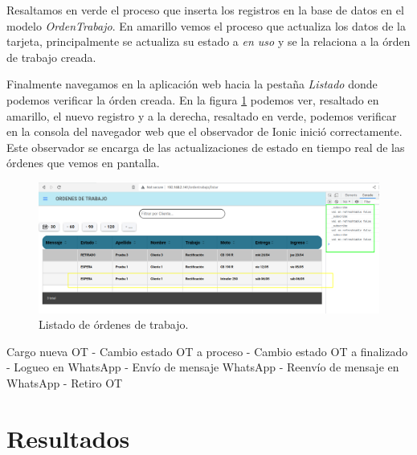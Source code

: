 Resaltamos en verde el proceso que inserta los registros en la base de datos en el modelo \textit{OrdenTrabajo}. En amarillo vemos el proceso que actualiza los datos de la tarjeta, principalmente se actualiza su estado a \textit{en uso} y se la relaciona a la órden de trabajo creada.

Finalmente navegamos en la aplicación web hacia la pestaña \textit{Listado} donde podemos verificar la órden creada. En la figura \ref{fig:ensayolistado} podemos ver, resaltado en amarillo, el nuevo registro y a la derecha, resaltado en verde, podemos verificar en la consola del navegador web que el observador de Ionic inició correctamente. Este observador se encarga de las actualizaciones de estado en tiempo real de las órdenes que vemos en pantalla.

\begin{figure}[H]
	\centering
	\includegraphics[width=\textwidth]{./Figures/ensayo-1/11.listado.png}
	\caption{Listado de órdenes de trabajo.}
	\label{fig:ensayolistado}
\end{figure}


Cargo nueva OT
- Cambio estado OT a proceso
- Cambio estado OT a finalizado
- Logueo en WhatsApp
- Envío de mensaje WhatsApp
- Reenvío de mensaje en WhatsApp
- Retiro OT

\section{Resultados}
\label{sec:resultados}




